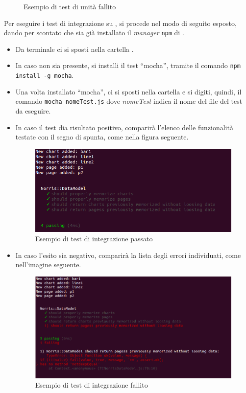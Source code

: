 \begin{itemize}
\begin{figure}[H]
							\caption{Esempio di test di unità fallito}
						\end{figure}
					\end{itemize}
					Per eseguire i test di integrazione su , si procede nel modo di seguito esposto, dando per scontato che sia già installato il \textit{ manager} \texttt{npm} di .
					\begin{itemize}
						\item Da terminale ci si sposti nella cartella .
						\item In caso non sia presente, si installi il test  “mocha”, tramite il comando \texttt{npm install -g mocha}. 
						\item Una volta installato “mocha”, ci si sposti nella cartella  e si digiti, quindi, il comando \texttt{mocha nomeTest.js} dove \textit{nomeTest} indica il nome del file del test da eseguire.
						\item In caso il test dia risultato positivo, comparirà l'elenco delle funzionalità testate con il segno di spunta, come nella figura seguente.
						\begin{figure}[H]
							\centering
							\includegraphics[scale=0.5]{Pics/TIPassing.png}
							\caption{Esempio di test di integrazione passato}
						\end{figure}
						\item In caso l'esito sia negativo, comparirà la lista degli errori individuati, come nell'imagine seguente.
						\begin{figure}[H]
							\centering
							\includegraphics[scale=0.5]{Pics/TINotPassing.png}
							\caption{Esempio di test di integrazione fallito}
						\end{figure}
					\end{itemize}
					

